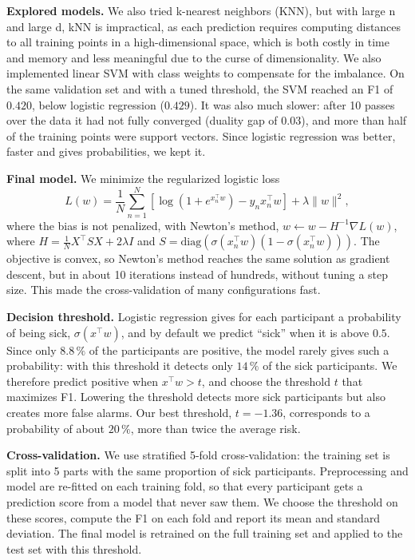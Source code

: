 \documentclass[10pt,conference,compsocconf]{IEEEtran}
\begin{document}
\textbf{Explored models.} We also tried k-nearest neighbors (KNN), but with large n and large d, kNN is impractical, as each prediction requires computing distances to all training points in a high-dimensional space, which is both costly in time and memory and less meaningful due to the curse of dimensionality.
We also implemented linear SVM with class weights to compensate for the imbalance. On the same
validation set and with a tuned threshold, the SVM reached an F1 of $0.420$, below
logistic regression ($0.429$). It was also much slower: after 10 passes over the data
it had not fully converged (duality gap of $0.03$), and more than half of the training
points were support vectors. Since logistic regression was better, faster and gives
probabilities, we kept it.

\textbf{Final model.} We minimize the regularized logistic loss
\begin{equation}
L(w) = \frac{1}{N}\sum_{n=1}^{N} \left[\log\left(1 + e^{x_n^\top w}\right) - y_n x_n^\top w\right] + \lambda \|w\|^2 ,
\end{equation}
where the bias is not penalized, with Newton's method,
$w \leftarrow w - H^{-1}\nabla L(w)$, where
$H = \frac{1}{N} X^\top S X + 2\lambda I$ and $S = \mathrm{diag}(\sigma(x_n^\top w)(1-\sigma(x_n^\top w)))$.
The objective is convex, so Newton's method reaches the same solution as gradient
descent, but in about 10 iterations instead of hundreds, without tuning a step size.
This made the cross-validation of many configurations fast.

\textbf{Decision threshold.} Logistic regression gives for each participant a
probability of being sick, $\sigma(x^\top w)$, and by default we predict ``sick'' when
it is above $0.5$. Since only $8.8\,\%$ of the participants are positive, the model
rarely gives such a probability: with this threshold it detects only $14\,\%$ of the
sick participants. We therefore predict positive when $x^\top w > t$, and choose the
threshold $t$ that maximizes F1. Lowering the threshold detects more sick participants
but also creates more false alarms. Our best threshold, $t = -1.36$, corresponds to a
probability of about $20\,\%$, more than twice the average risk.

\textbf{Cross-validation.} We use stratified 5-fold cross-validation: the training set is split into 5 parts with the same proportion of sick participants. Preprocessing and model are re-fitted on each training
fold, so that every participant gets a prediction score
from a model that never saw them. We choose the threshold on these scores, compute the F1 on each fold and report its mean and standard deviation. The final model is retrained on the full training set and applied to the test set with this threshold.
\end{document}
